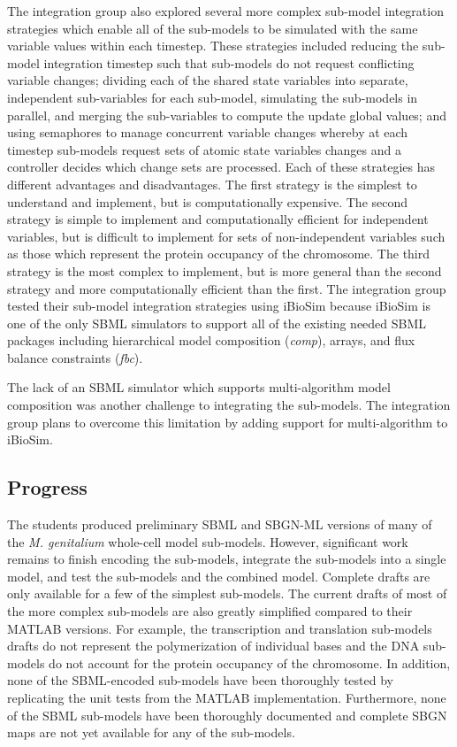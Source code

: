 \documentclass[journal,transmag]{IEEEtran}
\begin{document}
The integration group also explored several more complex sub-model integration strategies which enable all of the sub-models to be simulated with the same variable values within each timestep. These strategies included reducing the sub-model integration timestep such that sub-models do not request conflicting variable changes; dividing each of the shared state variables into separate, independent sub-variables for each sub-model, simulating the sub-models in parallel, and merging the sub-variables to compute the update global values; and using semaphores to manage concurrent variable changes whereby at each timestep sub-models request sets of atomic state variables changes and a controller decides which change sets are processed. Each of these strategies has different advantages and disadvantages. The first strategy is the simplest to understand and implement, but is computationally expensive. The second strategy is simple to implement and computationally efficient for independent variables, but is difficult to implement for sets of non-independent variables such as those which represent the protein occupancy of the chromosome. The third strategy is the most complex to implement, but is more general than the second strategy and more computationally efficient than the first. The integration group tested their sub-model integration strategies using iBioSim because iBioSim is one of the only SBML simulators to support all of the existing needed SBML packages including hierarchical model composition (\emph{comp}), arrays, and flux balance constraints (\emph{fbc}).

The lack of an SBML simulator which supports multi-algorithm model composition was another challenge to integrating the sub-models. The integration group plans to overcome this limitation by adding support for multi-algorithm to iBioSim.

\subsection{Progress}
The students produced preliminary SBML and SBGN-ML versions of many of the \textit{M. genitalium} whole-cell model sub-models. However, significant work remains to finish encoding the sub-models, integrate the sub-models into a single model, and test the sub-models and the combined model. Complete drafts are only available for a few of the simplest sub-models. The current drafts of most of the more complex sub-models are also greatly simplified compared to their MATLAB versions. For example, the transcription and translation sub-models drafts do not represent the polymerization of individual bases and the DNA sub-models do not account for the protein occupancy of the chromosome. In addition, none of the SBML-encoded sub-models have been thoroughly tested by replicating the unit tests from the MATLAB implementation. Furthermore, none of the SBML sub-models have been thoroughly documented and complete SBGN maps are not yet available for any of the sub-models.
\end{document}
